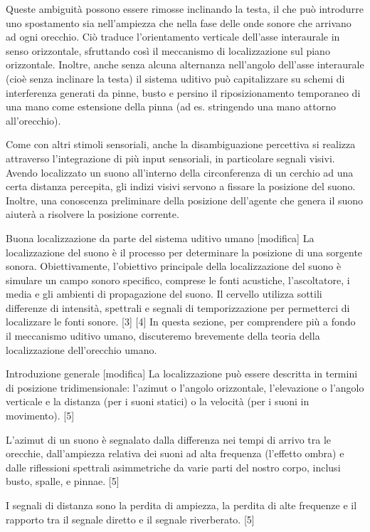 Queste ambiguità possono essere rimosse inclinando la testa, il che può introdurre uno spostamento sia nell'ampiezza che nella fase delle onde sonore che arrivano ad ogni orecchio. Ciò traduce l'orientamento verticale dell'asse interaurale in senso orizzontale, sfruttando così il meccanismo di localizzazione sul piano orizzontale. Inoltre, anche senza alcuna alternanza nell'angolo dell'asse interaurale (cioè senza inclinare la testa) il sistema uditivo può capitalizzare su schemi di interferenza generati da pinne, busto e persino il riposizionamento temporaneo di una mano come estensione della pinna (ad es. stringendo una mano attorno all'orecchio).

Come con altri stimoli sensoriali, anche la disambiguazione percettiva si realizza attraverso l'integrazione di più input sensoriali, in particolare segnali visivi. Avendo localizzato un suono all'interno della circonferenza di un cerchio ad una certa distanza percepita, gli indizi visivi servono a fissare la posizione del suono. Inoltre, una conoscenza preliminare della posizione dell'agente che genera il suono aiuterà a risolvere la posizione corrente.

Buona localizzazione da parte del sistema uditivo umano [modifica]
La localizzazione del suono è il processo per determinare la posizione di una sorgente sonora. Obiettivamente, l'obiettivo principale della localizzazione del suono è simulare un campo sonoro specifico, comprese le fonti acustiche, l'ascoltatore, i media e gli ambienti di propagazione del suono. Il cervello utilizza sottili differenze di intensità, spettrali e segnali di temporizzazione per permetterci di localizzare le fonti sonore. [3] [4] In questa sezione, per comprendere più a fondo il meccanismo uditivo umano, discuteremo brevemente della teoria della localizzazione dell'orecchio umano.

Introduzione generale [modifica]
La localizzazione può essere descritta in termini di posizione tridimensionale: l'azimut o l'angolo orizzontale, l'elevazione o l'angolo verticale e la distanza (per i suoni statici) o la velocità (per i suoni in movimento). [5]

L'azimut di un suono è segnalato dalla differenza nei tempi di arrivo tra le orecchie, dall'ampiezza relativa dei suoni ad alta frequenza (l'effetto ombra) e dalle riflessioni spettrali asimmetriche da varie parti del nostro corpo, inclusi busto, spalle, e pinnae. [5]

I segnali di distanza sono la perdita di ampiezza, la perdita di alte frequenze e il rapporto tra il segnale diretto e il segnale riverberato. [5]

